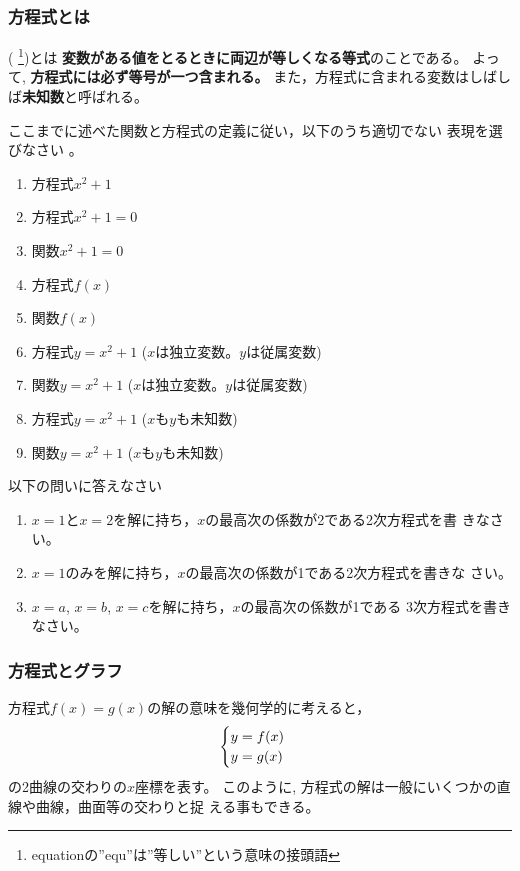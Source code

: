 \documentclass[twocolumn,11pt]{jarticle}
\begin{document}
\subsubsection{方程式とは}

(
\footnote{equationの''equ''は''等しい''という意味の接頭語})とは
\textbf{変数がある値をとるときに両辺が等しくなる等式}のことである。
よって, \textbf{方程式には必ず等号が一つ含まれる。}
また，方程式に含まれる変数はしばしば\textbf{未知数}と呼ばれる。

\nquestion
ここまでに述べた関数と方程式の定義に従い，以下のうち適切でない
表現を選びなさい
。
\begin{enumerate}
\item 方程式$x^2+1$
\item 方程式$x^2+1=0$
\item 関数$x^2+1=0$
\item 方程式$f(x)$
\item 関数$f(x)$
\item 方程式$y=x^2+1$ ($x$は独立変数。$y$は従属変数)
\item 関数$y=x^2+1$ ($x$は独立変数。$y$は従属変数)
\item 方程式$y=x^2+1$ ($x$も$y$も未知数)
\item 関数$y=x^2+1$ ($x$も$y$も未知数)
\end{enumerate}

\nquestion
以下の問いに答えなさい
\begin{enumerate}
\item $x=1$と$x=2$を解に持ち，$x$の最高次の係数が2である2次方程式を書
  きなさい。
\item $x=1$のみを解に持ち，$x$の最高次の係数が1である2次方程式を書きな
  さい。
\item $x=a$, $x=b$, $x=c$を解に持ち，$x$の最高次の係数が1である
  3次方程式を書きなさい。
\end{enumerate}

\subsubsection{方程式とグラフ}

方程式$f(x)=g(x)$の解の意味を幾何学的に考えると，
\begin{align}
  \begin{cases}
    y=f(x)\\
    y=g(x)
  \end{cases}\notag
\end{align}
の2曲線の交わりの$x$座標を表す。
このように, 方程式の解は一般にいくつかの直線や曲線，曲面等の交わりと捉
える事もできる。
\end{document}
